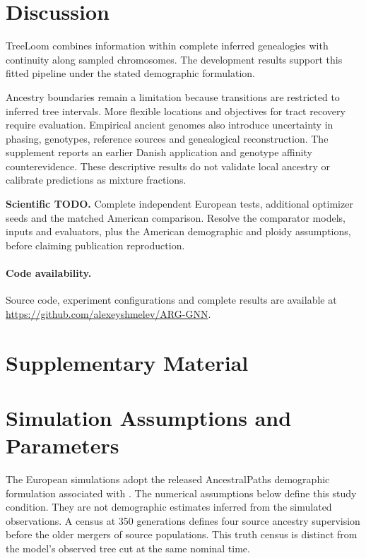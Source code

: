 \documentclass[letterpaper]{article}
\newcommand{\todo}[1]{\par\noindent\textbf{Scientific TODO.} #1\par}
\begin{document}
\section{Discussion}
TreeLoom combines information within complete inferred genealogies with continuity along sampled chromosomes. The development results support this fitted pipeline under the stated demographic formulation.

Ancestry boundaries remain a limitation because transitions are restricted to inferred tree intervals. More flexible locations and objectives for tract recovery require evaluation. Empirical ancient genomes also introduce uncertainty in phasing, genotypes, reference sources and genealogical reconstruction. The supplement reports an earlier Danish application and genotype affinity counterevidence. These descriptive results do not validate local ancestry or calibrate predictions as mixture fractions.

\todo{Complete independent European tests, additional optimizer seeds and the matched American comparison. Resolve the comparator models, inputs and evaluators, plus the American demographic and ploidy assumptions, before claiming publication reproduction.}

\paragraph{Code availability.}
Source code, experiment configurations and complete results are available at \url{https://github.com/alexeyshmelev/ARG-GNN}.



\clearpage
\appendix
\section*{Supplementary Material}

\section{Simulation Assumptions and Parameters}
\label{app:simulation}
The European simulations adopt the released AncestralPaths demographic formulation associated with \citet{eurasians2024}. The numerical assumptions below define this study condition. They are not demographic estimates inferred from the simulated observations. A census at 350 generations defines four source ancestry supervision before the older mergers of source populations. This truth census is distinct from the model's observed tree cut at the same nominal time.
\end{document}
